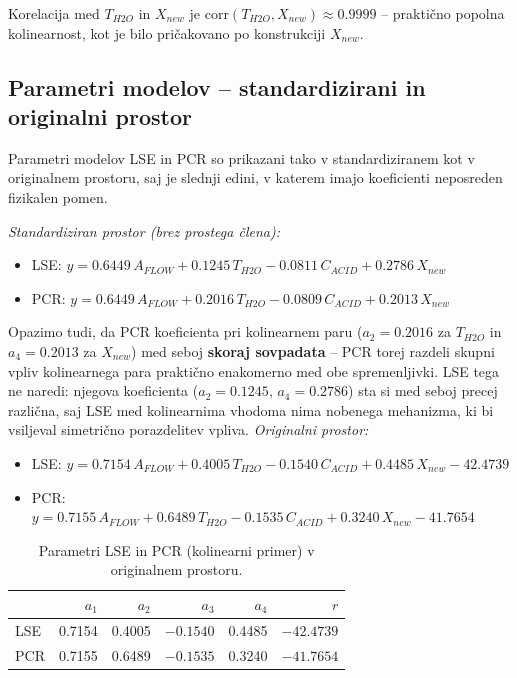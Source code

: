 \documentclass[a4paper, 11pt]{article}
\begin{document}
Korelacija med $T_{H2O}$ in $X_{new}$ je $\mathrm{corr}(T_{H2O}, X_{new}) \approx 0.9999$
-- praktično popolna kolinearnost, kot je bilo pričakovano po konstrukciji $X_{new}$.

\subsection{Parametri modelov -- standardizirani in originalni prostor}

Parametri modelov LSE in PCR so prikazani tako v standardiziranem kot v originalnem
prostoru, saj je slednji edini, v katerem imajo koeficienti neposreden fizikalen pomen.

\textit{Standardiziran prostor (brez prostega člena):}
\begin{itemize}
    \setlength\itemsep{2pt}
    \item[] LSE: $y = 0.6449\,A_{FLOW} + 0.1245\,T_{H2O} - 0.0811\,C_{ACID} + 0.2786\,X_{new}$
    \item[] PCR: $y = 0.6449\,A_{FLOW} + 0.2016\,T_{H2O} - 0.0809\,C_{ACID} + 0.2013\,X_{new}$
\end{itemize}

Opazimo tudi, da PCR koeficienta pri kolinearnem paru ($a_{2} = 0.2016$ za $T_{H2O}$ in
$a_{4} = 0.2013$ za $X_{new}$) med seboj \textbf{skoraj sovpadata} -- PCR torej razdeli
skupni vpliv kolinearnega para praktično enakomerno med obe spremenljivki. LSE tega ne
naredi: njegova koeficienta ($a_2 = 0.1245$, $a_4 = 0.2786$) sta si med seboj precej
različna, saj LSE med kolinearnima vhodoma nima nobenega mehanizma, ki bi vsiljeval
simetrično porazdelitev vpliva.
\textit{Originalni prostor:}
\begin{itemize}
    \setlength\itemsep{2pt}
    \item[] LSE: $y = 0.7154\,A_{FLOW} + 0.4005\,T_{H2O} - 0.1540\,C_{ACID} + 0.4485\,X_{new} - 42.4739$
    \item[] PCR: $y = 0.7155\,A_{FLOW} + 0.6489\,T_{H2O} - 0.1535\,C_{ACID} + 0.3240\,X_{new} - 41.7654$
\end{itemize}

\begin{table}[H]
\centering
\caption{Parametri LSE in PCR (kolinearni primer) v originalnem prostoru.}
\begin{tabular}{lrrrrr}
\toprule
 & $a_1$ & $a_2$ & $a_3$ & $a_4$ & $r$ \\
\midrule
LSE & 0.7154 & 0.4005 & $-0.1540$ & 0.4485 & $-42.4739$ \\
PCR & 0.7155 & 0.6489 & $-0.1535$ & 0.3240 & $-41.7654$ \\
\bottomrule
\end{tabular}
\end{table}
\end{document}
